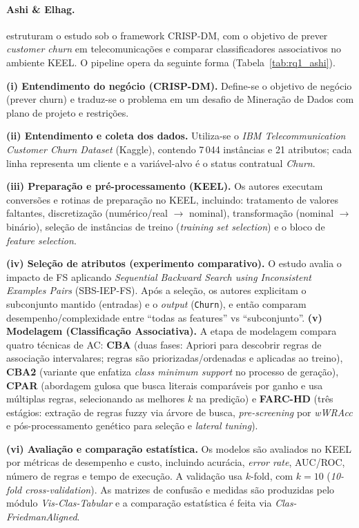 \paragraph*{Ashi \& Elhag.} 

 estruturam o estudo sob o framework CRISP-DM, com o objetivo de prever \textit{customer churn} em telecomunicações e comparar classificadores associativos no ambiente KEEL. O pipeline opera da seguinte forma (Tabela~\ref{tab:rq1_ashi}).

\textbf{(i) Entendimento do negócio (CRISP-DM).}
Define-se o objetivo de negócio (prever churn) e traduz-se o problema em um desafio de Mineração de Dados com plano de projeto e restrições.

\textbf{(ii) Entendimento e coleta dos dados.}
Utiliza-se o \textit{IBM Telecommunication Customer Churn Dataset} (Kaggle), contendo 7\,044 instâncias e 21 atributos; cada linha representa um cliente e a variável-alvo é o status contratual \textit{Churn}.

\textbf{(iii) Preparação e pré-processamento (KEEL).}
Os autores executam conversões e rotinas de preparação no KEEL, incluindo: tratamento de valores faltantes, discretização (numérico/real $\rightarrow$ nominal), transformação (nominal $\rightarrow$ binário), seleção de instâncias de treino (\textit{training set selection}) e o bloco de \textit{feature selection}. 

\textbf{(iv) Seleção de atributos (experimento comparativo).}
O estudo avalia o impacto de FS aplicando \textit{Sequential Backward Search using Inconsistent Examples Pairs} (SBS-IEP-FS). Após a seleção, os autores explicitam o subconjunto mantido (entradas) e o \textit{output} (\texttt{Churn}), e então comparam desempenho/complexidade entre “todas as features” vs “subconjunto”. 
\textbf{(v) Modelagem (Classificação Associativa).}
A etapa de modelagem compara quatro técnicas de AC:
\textbf{CBA} (duas fases: Apriori para descobrir regras de associação intervalares; regras são priorizadas/ordenadas e aplicadas ao treino), \textbf{CBA2} (variante que enfatiza \textit{class minimum support} no processo de geração), \textbf{CPAR} (abordagem gulosa que busca literais comparáveis por ganho e usa múltiplas regras, selecionando as melhores $k$ na predição) e \textbf{FARC-HD} (três estágios: extração de regras fuzzy via árvore de busca, \textit{pre-screening} por \textit{wWRAcc} e pós-processamento genético para seleção e \textit{lateral tuning}). 

\textbf{(vi) Avaliação e comparação estatística.}
Os modelos são avaliados no KEEL por métricas de desempenho e custo, incluindo acurácia, \textit{error rate}, AUC/ROC, número de regras e tempo de execução. 
A validação usa $k$-fold, com $k=10$ (\textit{10-fold cross-validation}).
As matrizes de confusão e medidas são produzidas pelo módulo \textit{Vis-Clas-Tabular} e a comparação estatística é feita via \textit{Clas-FriedmanAligned}.


